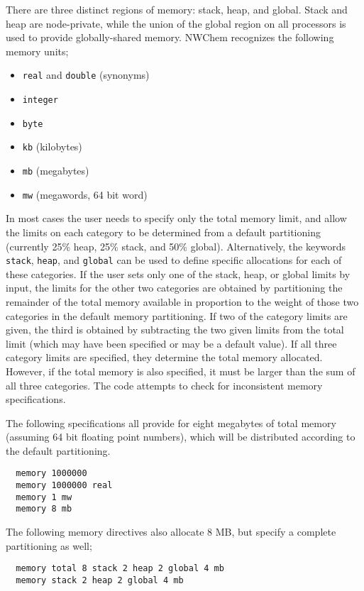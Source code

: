 There are three distinct regions of memory: stack, heap, and global.
Stack and heap are node-private, while the union of the global region
on all processors is used to provide globally-shared memory.  NWChem
recognizes the following memory units;
\begin{itemize}
\item \verb+real+ and \verb+double+ (synonyms)
\item \verb+integer+
\item \verb+byte+
\item \verb+kb+ (kilobytes)
\item \verb+mb+ (megabytes)
\item \verb+mw+ (megawords, 64 bit word)
\end{itemize}

In most cases the user needs to specify only the total memory limit,
and allow the limits on each category to be determined from a default
partitioning (currently 25\% heap, 25\% stack, and 50\% global).
Alternatively, the keywords \verb+stack+, \verb+heap+, and
\verb+global+ can be used to define specific allocations for each of
these categories.  If the user sets only one of the stack, heap, or
global limits by input, the limits for the other two categories are
obtained by partitioning the remainder of the total memory available
in proportion to the weight of those two categories in the default
memory partitioning.  If two of the category limits are given, the
third is obtained by subtracting the two given limits from the total
limit (which may have been specified or may be a default value).  If
all three category limits are specified, they determine the total
memory allocated.  However, if the total memory is also specified, it
must be larger than the sum of all three categories.  The code
attempts to check for inconsistent memory specifications.

The following specifications all provide for eight megabytes of total memory 
(assuming 64 bit floating point numbers), which
will be distributed according to the default partitioning.
\begin{verbatim}
  memory 1000000
  memory 1000000 real
  memory 1 mw
  memory 8 mb
\end{verbatim}

The following memory directives also allocate 8 MB, but specify a complete
partitioning as well;

\begin{verbatim}
  memory total 8 stack 2 heap 2 global 4 mb
  memory stack 2 heap 2 global 4 mb
\end{verbatim}

